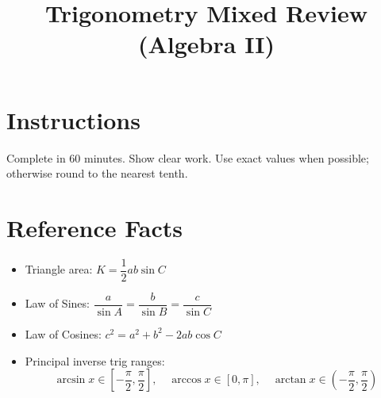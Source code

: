 \documentclass[12pt]{article}
\title{Trigonometry Mixed Review (Algebra II)}
\author{}
\date{}
\begin{document}
\maketitle

\section*{Instructions}
Complete in 60 minutes. Show clear work. Use exact values when possible; otherwise round to the nearest tenth.

\section*{Reference Facts}
\begin{itemize}[leftmargin=1.5em]
  \item Triangle area: $K=\dfrac{1}{2}ab\sin C$
  \item Law of Sines: $\dfrac{a}{\sin A}=\dfrac{b}{\sin B}=\dfrac{c}{\sin C}$
  \item Law of Cosines: $c^2=a^2+b^2-2ab\cos C$
  \item Principal inverse trig ranges:
  \[
  \arcsin x\in\left[-\frac{\pi}{2},\frac{\pi}{2}\right],\quad
  \arccos x\in[0,\pi],\quad
  \arctan x\in\left(-\frac{\pi}{2},\frac{\pi}{2}\right)
  \]
\end{itemize}
\end{document}

